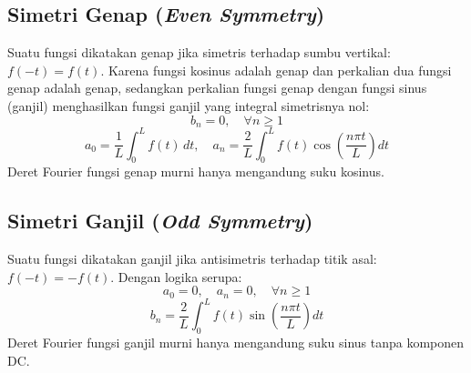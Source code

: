 \documentclass[11pt,a4paper]{article}
\theoremstyle{definition}
\begin{document}
\subsection{Simetri Genap (\textit{Even Symmetry})}
Suatu fungsi dikatakan genap jika simetris terhadap sumbu vertikal: $f(-t) = f(t)$.
Karena fungsi kosinus adalah genap dan perkalian dua fungsi genap adalah genap, sedangkan perkalian fungsi genap dengan fungsi sinus (ganjil) menghasilkan fungsi ganjil yang integral simetrisnya nol:
\begin{equation}
    b_n = 0, \quad \forall n \ge 1
\end{equation}
\begin{equation}
    a_0 = \frac{1}{L} \int_{0}^{L} f(t) \, dt, \quad a_n = \frac{2}{L} \int_{0}^{L} f(t) \cos\left(\frac{n\pi t}{L}\right) dt
    \label{eq:even_fourier}
\end{equation}
Deret Fourier fungsi genap murni hanya mengandung suku kosinus.

\subsection{Simetri Ganjil (\textit{Odd Symmetry})}
Suatu fungsi dikatakan ganjil jika antisimetris terhadap titik asal: $f(-t) = -f(t)$.
Dengan logika serupa:
\begin{equation}
    a_0 = 0, \quad a_n = 0, \quad \forall n \ge 1
\end{equation}
\begin{equation}
    b_n = \frac{2}{L} \int_{0}^{L} f(t) \sin\left(\frac{n\pi t}{L}\right) dt
    \label{eq:odd_fourier}
\end{equation}
Deret Fourier fungsi ganjil murni hanya mengandung suku sinus tanpa komponen DC.
\end{document}
